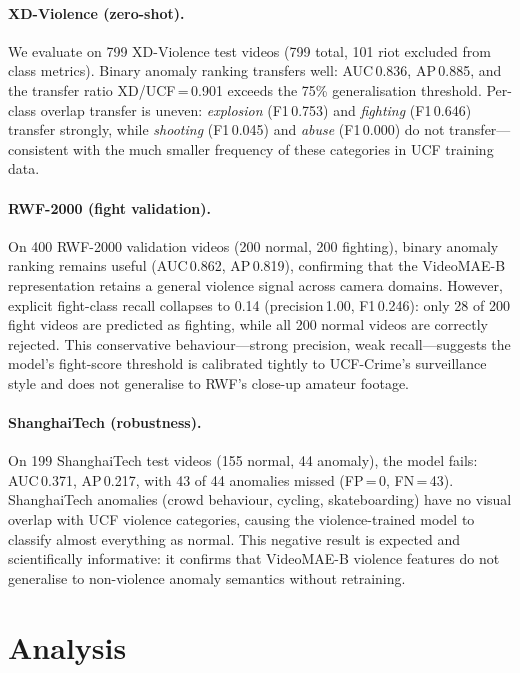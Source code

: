 \documentclass[11pt]{article}
\begin{document}
\paragraph{XD-Violence (zero-shot).}
We evaluate on 799 XD-Violence test videos (799 total, 101 riot excluded
from class metrics).
Binary anomaly ranking transfers well: AUC\,0.836, AP\,0.885, and
the transfer ratio XD/UCF\,=\,0.901 exceeds the 75\% generalisation
threshold.
Per-class overlap transfer is uneven:
\emph{explosion} (F1\,0.753) and \emph{fighting} (F1\,0.646) transfer
strongly, while \emph{shooting} (F1\,0.045) and \emph{abuse} (F1\,0.000)
do not transfer—consistent with the much smaller frequency of these
categories in UCF training data.

\paragraph{RWF-2000 (fight validation).}
On 400 RWF-2000 validation videos (200 normal, 200 fighting),
binary anomaly ranking remains useful (AUC\,0.862, AP\,0.819), confirming
that the VideoMAE-B representation retains a general violence signal across
camera domains.
However, explicit fight-class recall collapses to 0.14 (precision\,1.00,
F1\,0.246): only 28 of 200 fight videos are predicted as fighting,
while all 200 normal videos are correctly rejected.
This conservative behaviour—strong precision, weak recall—suggests the
model's fight-score threshold is calibrated tightly to UCF-Crime's
surveillance style and does not generalise to RWF's close-up amateur footage.

\paragraph{ShanghaiTech (robustness).}
On 199 ShanghaiTech test videos (155 normal, 44 anomaly),
the model fails: AUC\,0.371, AP\,0.217, with 43 of 44 anomalies missed
(FP\,=\,0, FN\,=\,43).
ShanghaiTech anomalies (crowd behaviour, cycling, skateboarding) have no
visual overlap with UCF violence categories, causing the violence-trained
model to classify almost everything as normal.
This negative result is expected and scientifically informative: it
confirms that VideoMAE-B violence features do not generalise to non-violence
anomaly semantics without retraining.


\section{Analysis}
\end{document}
